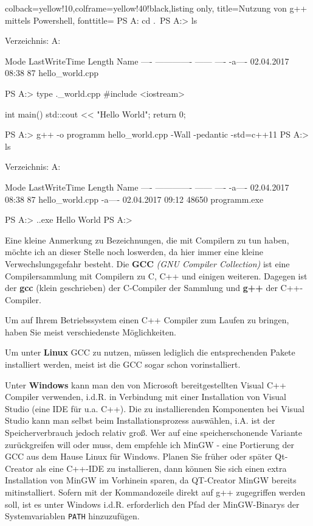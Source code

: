 \documentclass[a4paper]{report}
\begin{document}
\begin{tcblisting}{colback=yellow!10,colframe=yellow!40!black,listing only,
		title=Nutzung von g++ mittels Powershell, fonttitle=\bfseries}
PS A:\> cd .\example\
PS A:\example> ls


Verzeichnis: A:\example


Mode                LastWriteTime         Length Name
----                -------------         ------ ----
-a----       02.04.2017     08:38             87 hello_world.cpp


PS A:\example> type .\hello_world.cpp
#include <iostream>

int main(){
	std::cout << "Hello World";
	return 0;
}

PS A:\example> g++ -o programm hello_world.cpp -Wall -pedantic -std=c++11
PS A:\example> ls


Verzeichnis: A:\example


Mode                LastWriteTime         Length Name
----                -------------         ------ ----
-a----       02.04.2017     08:38             87 hello_world.cpp
-a----       02.04.2017     09:12          48650 programm.exe


PS A:\example> .\programm.exe
Hello World
PS A:\example>
\end{tcblisting}

Eine kleine Anmerkung zu Bezeichnungen, die mit Compilern zu tun haben, möchte ich an dieser Stelle noch loswerden, da hier immer eine kleine Verwechslungsgefahr besteht. Die \textbf{GCC} \textit{(GNU Compiler Collection)} ist eine Compilersammlung mit Compilern zu C, C++ und einigen weiteren. Dagegen ist der \textbf{gcc} (klein geschrieben) der C-Compiler der Sammlung und \textbf{g++} der C++-Compiler.

Um auf Ihrem Betriebssystem einen C++ Compiler zum Laufen zu bringen, haben Sie meist verschiedenste Möglichkeiten.

Um unter \textbf{Linux} GCC zu nutzen, müssen lediglich die entsprechenden Pakete installiert werden, meist ist die GCC sogar schon vorinstalliert.

Unter \textbf{Windows} kann man den von Microsoft bereitgestellten Visual C++ Compiler verwenden, i.d.R. in Verbindung mit einer Installation von Visual Studio (eine IDE für u.a. C++). Die zu installierenden Komponenten bei Visual Studio kann man selbst beim Installationsprozess auswählen, i.A. ist der Speicherverbrauch jedoch relativ groß. Wer auf eine speicherschonende Variante zurückgreifen will oder muss, dem empfehle ich MinGW - eine Portierung der GCC aus dem Hause Linux für Windows. Planen Sie früher oder später Qt-Creator als eine C++-IDE zu installieren, dann können Sie sich einen extra Installation von MinGW im Vorhinein sparen, da QT-Creator MinGW bereits mitinstalliert. Sofern mit der Kommandozeile direkt auf g++ zugegriffen werden soll, ist es unter Windows i.d.R. erforderlich den Pfad der MinGW-Binarys der Systemvariablen \texttt{PATH} hinzuzufügen.
\end{document}

